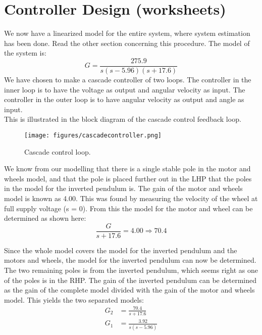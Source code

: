 \chapter{Controller Design (worksheets)}\label{ch:Controller}
We now have a linearized model for the entire system, where system estimation has been done. Read the other section concerning this procedure. \newpar 
The model of the system is:
\begin{equation}
G=\frac{275.9}{s(s-5.96)(s+17.6)} \label{kkk}
\end{equation}
We have chosen to make a cascade controller of two loops. The controller in the inner loop is to have the voltage as output and angular velocity as input. The controller in the outer loop is to have angular velocity as output and angle as input.\\
This is illustrated in the block diagram of the cascade control feedback loop. 
\begin{figure}[H]
	\centering
	\texttt{[image: figures/cascadecontroller.png]}
	\caption{Cascade control loop.}
\end{figure}
We know from our modelling that there is a single stable pole in the motor and wheels model, and that the pole is placed further out in the LHP that the poles in the model for the inverted pendulum is. The gain of the motor and wheels model is known as 4.00. This was found by measuring the velocity of the wheel at full supply voltage (s = 0). From this the model for the motor and wheel can be determined as shown here:
\begin{equation}
\frac{G}{s+17.6}=4.00\Rightarrow 70.4
\end{equation}

Since the whole model covers the model for the inverted pendulum and the motors and wheels, the model for the inverted pendulum can now be determined. The two remaining poles is from the inverted pendulum, which seems right as one of the poles is in the RHP. The gain of the inverted pendulum can be determined as the gain of the complete model divided with the gain of the motor and wheels model. This yields the two separated models:
\begin{align}
G_2&=\frac{70.4}{s+17.6}\\
G_1&=\frac{3.92}{s(s-5.96)}
\end{align}







